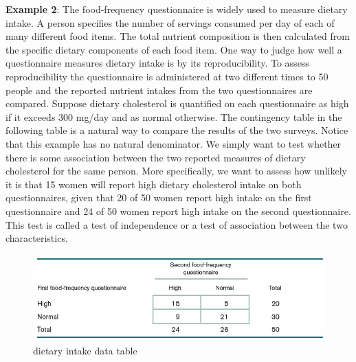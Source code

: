 \documentclass[
]{book}
\begin{document}
\textbf{Example 2}: The food-frequency questionnaire is widely used to measure dietary intake. A person specifies the number of servings consumed per day of each of many different food items. The total nutrient composition is then calculated from the specific dietary components of each food item. One way to judge how well a questionnaire measures dietary intake is by its reproducibility. To assess reproducibility the questionnaire is administered at two different times to 50 people and the reported nutrient intakes from the two questionnaires are compared. Suppose dietary cholesterol is quantified on each questionnaire as high if it exceeds 300 mg/day and as normal otherwise. The contingency table in the following table is a natural way to compare the results of the two surveys. Notice that this example has no natural denominator. We simply want to test whether there is some association between the two reported measures of dietary cholesterol for the same person. More specifically, we want to assess how unlikely it is that 15 women will report high dietary cholesterol intake on both questionnaires, given that 20 of 50 women report high intake on the first questionnaire and 24 of 50 women report high intake on the second questionnaire. This test is called a test of independence or a test of association between the two characteristics.

\begin{figure}

{\centering \includegraphics[width=0.8\linewidth]{img12/w12-casestudy02} 

}

\caption{ dietary intake data table}\label{fig:unnamed-chunk-203}
\end{figure}
\end{document}
